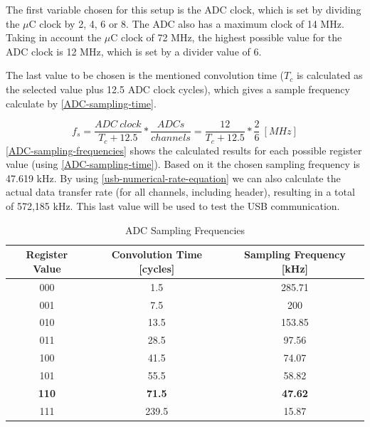 The first variable chosen for this setup is the ADC clock, which is set by dividing
the $\mu$C clock by 2, 4, 6 or 8. The ADC also has a maximum clock of 14 MHz. Taking in
account the  $\mu$C clock of 72 MHz, the highest possible value for the ADC clock is 12 MHz,
which is set by a divider value of 6. 

The last value to be chosen is the mentioned convolution time ($T_{c}$ is calculated as the selected
value plus 12.5 ADC clock cycles), which gives a sample frequency calculate by \autoref{ADC-sampling-time}.

\begin{equation}
  \label{ADC-sampling-time}
  f_{s} = \frac{ADC\ clock}{T_{c} + 12.5}  * \frac{ADCs}{channels} = \frac{12}{T_{c} + 12.5}  * \frac{2}{6}\ [MHz]
\end{equation}
\autoref{ADC-sampling-frequencies} shows the calculated results for each possible
register value (using \autoref{ADC-sampling-time}). Based on it the chosen sampling
frequency is 47.619 kHz. By using \autoref{usb-numerical-rate-equation} we can also
calculate the actual data transfer rate (for all channels, including header),
resulting in a total of 572,185 kHz. This last value will be used to test the USB communication.

\begin{table}[htb]
  \caption{ADC Sampling Frequencies}
  \label{ADC-sampling-frequencies}
  \begin{tabular}{c|c|c}
    \textbf{Register Value} & \textbf{Convolution Time [cycles]} & \textbf{Sampling Frequency [kHz]}\\
    \hline \hline
    000 & 1.5 & 285.71 \\
    \hline
    001 & 7.5 & 200 \\
    \hline
    010 & 13.5 & 153.85 \\
    \hline
    011 & 28.5 & 97.56 \\
    \hline
    100 & 41.5 & 74.07 \\
    \hline
    101 & 55.5 & 58.82 \\
    \hline
    \textbf{110} & \textbf{71.5} & \textbf{47.62} \\
    \hline
    111 & 239.5 & 15.87 \\
  \end{tabular}
\end{table}
